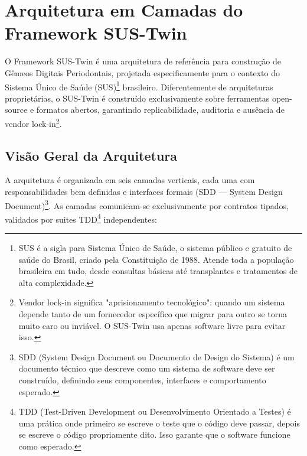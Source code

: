
\section{Arquitetura em Camadas do Framework SUS-Twin}

O Framework SUS-Twin é uma arquitetura de referência para construção de Gêmeos Digitais Periodontais, projetada especificamente para o contexto do Sistema Único de Saúde (SUS)\footnote{SUS é a sigla para Sistema Único de Saúde, o sistema público e gratuito de saúde do Brasil, criado pela Constituição de 1988. Atende toda a população brasileira em tudo, desde consultas básicas até transplantes e tratamentos de alta complexidade.} brasileiro. Diferentemente de arquiteturas proprietárias, o SUS-Twin é construído exclusivamente sobre ferramentas open-source e formatos abertos, garantindo replicabilidade, auditoria e ausência de vendor lock-in\footnote{Vendor lock-in significa "aprisionamento tecnológico": quando um sistema depende tanto de um fornecedor específico que migrar para outro se torna muito caro ou inviável. O SUS-Twin usa apenas software livre para evitar isso.}.

\subsection{Visão Geral da Arquitetura}

A arquitetura é organizada em seis camadas verticais, cada uma com responsabilidades bem definidas e interfaces formais (SDD --- System Design Document)\footnote{SDD (System Design Document ou Documento de Design do Sistema) é um documento técnico que descreve como um sistema de software deve ser construído, definindo seus componentes, interfaces e comportamento esperado.}. As camadas comunicam-se exclusivamente por contratos tipados, validados por suites TDD\footnote{TDD (Test-Driven Development ou Desenvolvimento Orientado a Testes) é uma prática onde primeiro se escreve o teste que o código deve passar, depois se escreve o código propriamente dito. Isso garante que o software funcione como esperado.} independentes:

